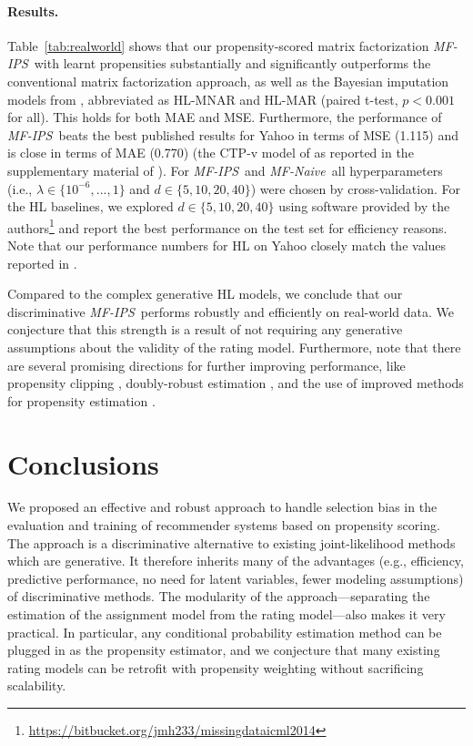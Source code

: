 \documentclass{article}
\newcommand{\naivemf}{\emph{MF-Naive}}      %
\newcommand{\ipsmf}{\emph{MF-IPS}}          %
\begin{document}
\paragraph{Results.}
Table~\ref{tab:realworld} shows that our propensity-scored matrix factorization \ipsmf\ with learnt propensities substantially and significantly outperforms the conventional matrix factorization approach, as well as the Bayesian imputation models from \cite{HL}, abbreviated as HL-MNAR and HL-MAR (paired t-test, $p<0.001$ for all). This holds for both MAE and MSE. Furthermore, the performance of \ipsmf\ beats the best published results for Yahoo in terms of MSE (1.115) and is close in terms of MAE (0.770) (the CTP-v model of \cite{Marlin/Zemel/09} as reported in the supplementary material of \citet{HL}). For \ipsmf\ and \naivemf\ all hyperparameters (i.e., $\lambda \in \{10^{-6}, ..., 1\}$ and $d \in \{5,10,20,40\}$) were chosen by cross-validation. For the HL baselines, we explored $d \in \{5,10,20,40\}$  using software provided by the authors\footnote{\href{https://bitbucket.org/jmh233/missingdataicml2014}{https://bitbucket.org/jmh233/missingdataicml2014}} and report the best performance on the test set for efficiency reasons. Note that our performance numbers for HL on Yahoo closely match the values reported in \cite{HL}.

Compared to the complex generative HL models, we conclude that our discriminative \ipsmf\ performs robustly and efficiently on real-world data. We conjecture that this strength is a result of not requiring any generative assumptions about the validity of the rating model. Furthermore, note that there are several promising directions for further improving performance, like propensity clipping \cite{Strehl/etal/10}, doubly-robust estimation \cite{dudik11doublyrobust}, and the use of improved methods for propensity estimation \cite{Mccaffrey04propensityscore}.

\section{Conclusions}

We proposed an effective and robust approach to handle selection bias in the evaluation and training of recommender systems based on propensity scoring.
The approach is a discriminative alternative to existing joint-likelihood methods which are generative.
It therefore inherits many of the advantages (e.g., efficiency, predictive performance, no need for latent variables, fewer modeling assumptions) of discriminative methods.
The modularity of the approach---separating the estimation of the assignment model from the rating model---also makes it very practical. In particular, 
any conditional probability estimation method can be plugged in as the propensity estimator, and we conjecture that many existing rating models can be retrofit with propensity weighting without sacrificing scalability.
\end{document}
